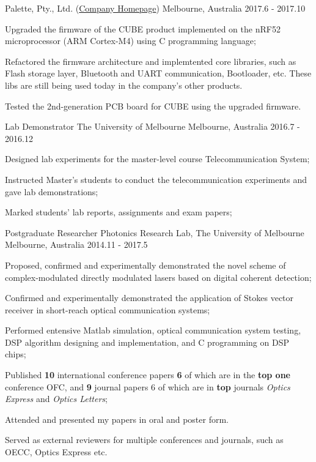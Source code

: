 \begin{cventries}
    {Palette, Pty., Ltd. (\href{https://palette.com/}{Company Homepage})}%
    {Melbourne, Australia}%
    {2017.6 - 2017.10}%
    {
      \begin{cvitems}
        \item Upgraded the firmware of the \textsc{CUBE} product implemented on the nRF52 microprocessor (ARM Cortex-M4) using C programming language;
        \item Refactored the firmware architecture and implemtented core libraries, such as Flash storage layer, Bluetooth and UART communication, Bootloader, etc. These libs are still being used today in the company's other products.
        \item Tested the 2nd-generation PCB board for \textsc{CUBE} using the upgraded firmware.
      \end{cvitems}
    }

    \cventry
      {Lab Demonstrator}%
      {The University of Melbourne}%
      {Melbourne, Australia}%
      {2016.7 - 2016.12}%
      {
        \begin{cvitems}
          \item Designed lab experiments for the master-level course Telecommunication System;
          \item Instructed Master's students to conduct the telecommunication experiments and gave lab demonstrations;
          \item Marked students' lab reports, assignments and exam papers;
        \end{cvitems}
      }

    \cventry
      {Postgraduate Researcher}%
      {Photonics Research Lab, The University of Melbourne}%
      {Melbourne, Australia}%
      {2014.11 - 2017.5}%
      {
        \begin{cvitems}
          \item Proposed, confirmed and experimentally demonstrated the novel scheme of complex-modulated directly modulated lasers based on digital coherent detection;
          \item Confirmed and experimentally demonstrated the application of Stokes vector receiver in short-reach optical communication systems;
          \item Performed entensive Matlab simulation, optical communication system testing, DSP algorithm designing and implementation, and C programming on DSP chips;
          \item Published \textbf{10} international conference papers \textbf{6} of which are in the \textbf{top one} conference OFC, and \textbf{9} journal papers 6 of which are in \textbf{top} journals \textit{Optics Express} and \textit{Optics Letters};
          \item Attended and presented my papers in oral and poster form.
          \item Served as external reviewers for multiple conferences and journals, such as OECC, Optics Express etc.
        \end{cvitems}
      }


\end{cventries}

